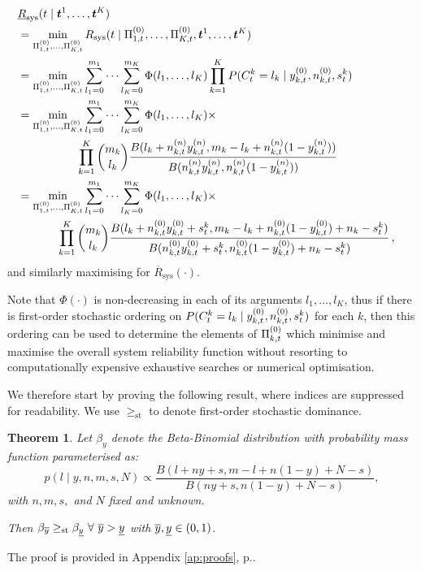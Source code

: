 \documentclass[12pt, a4paper]{elsarticle}
\newtheorem{theorem}{Theorem}
\newcommand{\bs}[1]{\boldsymbol{#1}}
\renewcommand{\vec}[1]{{\bs#1}}
\newcommand{\ul}[1]{\underline{#1}}
\newcommand{\ol}[1]{\overline{#1}}
\newcommand{\Rsys}{R_\text{sys}}
\newcommand{\lRsys}{\ul{R}_\text{sys}}
\newcommand{\uRsys}{\ol{R}_\text{sys}}
\begin{document}
\begin{align}
\lefteqn{\lRsys(t \mid \vec{t}^1, \ldots, \vec{t}^K)} \nonumber \\
 &= \min_{\PtZi{1}, \ldots, \PtZi{K}} \Rsys(t \mid \PtZi{1}, \ldots, \PtZi{K}, \vec{t}^1, \ldots, \vec{t}^K) \nonumber \\
 &= \min_{\PtZi{1}, \ldots, \PtZi{K}} 
    \sum_{l_1=0}^{m_1} \cdots \sum_{l_K=0}^{m_K} \Phi(l_1, \ldots, l_K)
                                                 \prod_{k=1}^K P(C^k_t = l_k \mid \yktz, \nktz, s^k_t) \nonumber \\
 &= \min_{\PtZi{1}, \ldots, \PtZi{K}} 
    \sum_{l_1=0}^{m_1} \cdots \sum_{l_K=0}^{m_K} \Phi(l_1, \ldots, l_K) \times \nonumber \\ & \hspace*{12ex}
    \prod_{k=1}^K {m_k \choose l_k} \frac{B(l_k + \nn_{k,t}\yn_{k,t}, m_k - l_k + \nn_{k,t}(1-\yn_{k,t}))}
                                         {B(\nn_{k,t}\yn_{k,t}, \nn_{k,t}(1-\yn_{k,t}))} \nonumber \\
 &= \min_{\PtZi{1}, \ldots, \PtZi{K}} 
    \sum_{l_1=0}^{m_1} \cdots \sum_{l_K=0}^{m_K} \Phi(l_1, \ldots, l_K) \times \nonumber \\ & \hspace*{8ex}
    \prod_{k=1}^K {m_k \choose l_k} \frac{B(l_k + \nktz\yktz + s^k_t, m_k - l_k + \nktz(1-\yktz) + n_k - s^k_t)}{B(\nktz\yktz + s^k_t, \nktz(1-\yktz) + n_k - s^k_t)}
    \,, \label{eq:LwrSysPostA}
\end{align}
and similarly maximising for $\uRsys(\cdot)$.

Note that $\Phi(\cdot)$ is non-decreasing in each of its arguments $l_1,\ldots,l_K$,
thus if there is first-order stochastic ordering on $P(C^k_t = l_k \mid y^{(0)}_{k,t}, n^{(0)}_{k,t}, s^k_t)$
for each $k$, then this ordering can be used to determine the elements of $\Pi^{(0)}_{k,t}$
which minimise and maximise the overall system reliability function without
resorting to computationally expensive exhaustive searches or numerical optimisation.

We therefore start by proving the following result, where indices are suppressed for readability.
We use $\ge_{\mathrm{st}}$ to denote first-order stochastic dominance.

\begin{theorem}
  \label{thm:y}
  Let $\beta_y$ denote the Beta-Binomial distribution with probability mass function parameterised as:
  \[ p(l \mid y, n, m, s, N) \propto \frac{B(l + ny + s, m - l + n(1-y) + N - s)}{B(ny + s, n(1-y) + N - s)}, \]
  with $n, m, s,$ and $N$ fixed and unknown.
  
  Then $\beta_{\yu} \ge_{\mathrm{st}} \beta_{\yl} \ \forall \ \yu > \yl$ with $\yu, \yl \in (0,1)$.
\end{theorem}
The proof is provided in Appendix \ref{ap:proofs}, p.\pageref{prf:y}.
\end{document}
